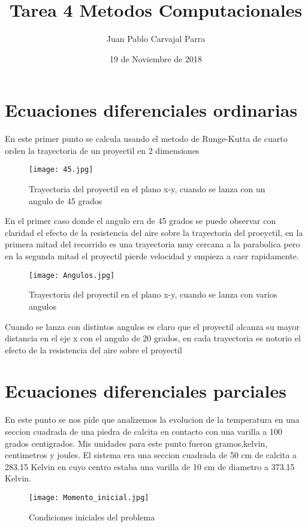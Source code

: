 \documentclass[12pt]{article}
\author{Juan Pablo Carvajal Parra}
\date{19 de Noviembre de 2018}
\title{Tarea 4 Metodos Computacionales}
\begin{document}
\section{Ecuaciones diferenciales ordinarias}

En este primer punto se calcula usando el metodo de Runge-Kutta de cuarto orden la trayectoria de un proyectil en 2 dimensiones  

\begin{figure}[h!]
    \centering
    \texttt{[image: 45.jpg]}
    \caption{Trayectoria del proyectil en el plano x-y, cuando se lanza con un angulo de 45 grados}
    \label{fig1}
\end{figure}

En el primer caso donde el angulo era de 45 grados se puede observar con claridad el efecto de la resistencia del aire sobre la trayectoria del proeyctil, en la primera mitad del recorrido es una trayectoria muy cercana a la parabolica pero en la segunda mitad el proyectil pierde velocidad y empieza a caer rapidamente.

\newpage
\begin{figure}[h!]
    \centering
    \texttt{[image: Angulos.jpg]}
    \caption{Trayectoria del proyectil en el plano x-y, cuando se lanza con varios angulos}
    \label{fig2}
\end{figure}

Cuando se lanza con distintos angulos es claro que el proyectil alcanza su mayor distancia en el eje x con el angulo de 20 grados, en cada trayectoria es notorio el efecto de la resistencia del aire sobre el proyectil

\newpage
\section{Ecuaciones diferenciales parciales}

En este punto se nos pide que analizemos la evolucion de la temperatura en una seccion cuadrada de una piedra de calcita en contacto con una varilla a 100 grados centigrados. Mis unidades para este punto fueron gramos,kelvin, centimetros y joules. El sistema era una seccion cuadrada de 50 cm de calcita a 283.15 Kelvin en cuyo centro estaba una varilla de 10 cm de diametro a 373.15 Kelvin.

\begin{figure}[h!]
    \centering
    \texttt{[image: Momento\_inicial.jpg]}
    \caption{Condiciones iniciales del problema}
    \label{fig3}
\end{figure}
\end{document}
